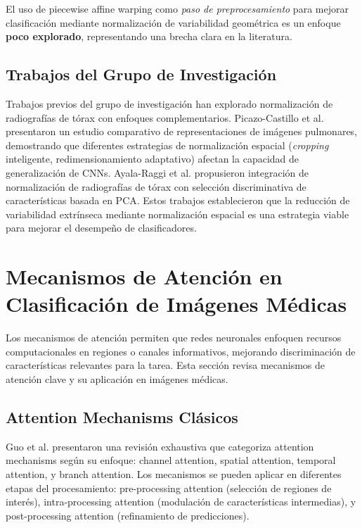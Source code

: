 El uso de piecewise affine warping como \textit{paso de preprocesamiento} para mejorar clasificación mediante normalización de variabilidad geométrica es un enfoque \textbf{poco explorado}, representando una brecha clara en la literatura.

\subsection{Trabajos del Grupo de Investigación}

Trabajos previos del grupo de investigación han explorado normalización de radiografías de tórax con enfoques complementarios. Picazo-Castillo et al. \cite{picazo2024comparative} presentaron un estudio comparativo de representaciones de imágenes pulmonares, demostrando que diferentes estrategias de normalización espacial (\textit{cropping} inteligente, redimensionamiento adaptativo) afectan la capacidad de generalización de CNNs. Ayala-Raggi et al. \cite{ayala2023synergizing} propusieron integración de normalización de radiografías de tórax con selección discriminativa de características basada en PCA. Estos trabajos establecieron que la reducción de variabilidad extrínseca mediante normalización espacial es una estrategia viable para mejorar el desempeño de clasificadores.


\section{Mecanismos de Atención en Clasificación de Imágenes Médicas}
\label{sec:mecanismos_atencion}

Los mecanismos de atención permiten que redes neuronales enfoquen recursos computacionales en regiones o canales informativos, mejorando discriminación de características relevantes para la tarea. Esta sección revisa mecanismos de atención clave y su aplicación en imágenes médicas.

\subsection{Attention Mechanisms Clásicos}

Guo et al. \cite{guo2022attention} presentaron una revisión exhaustiva que categoriza attention mechanisms según su enfoque: channel attention, spatial attention, temporal attention, y branch attention. Los mecanismos se pueden aplicar en diferentes etapas del procesamiento: pre-processing attention (selección de regiones de interés), intra-processing attention (modulación de características intermedias), y post-processing attention (refinamiento de predicciones).

